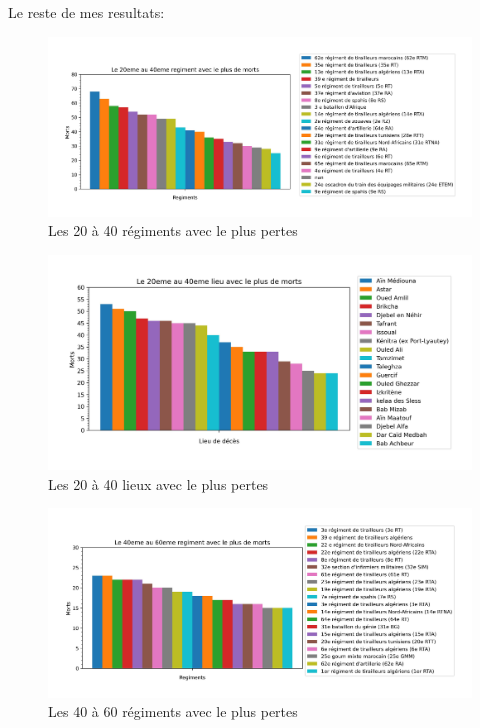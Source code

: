 Le reste de mes resultats: 
\begin{figure}[h]
    \centering
    \includegraphics[scale=0.7]{Images/next20regiments.jpg}
    \caption{Les 20 à 40 régiments avec le plus pertes}
    \label{fig:Régiments 2}
\end{figure}
\begin{figure}[h]
    \centering
    \includegraphics[scale=0.7]{Images/next20places.jpg}
    \caption{Les 20 à 40 lieux avec le plus pertes}
    \label{fig:Lieux 2}
\end{figure}
\begin{figure}[h]
    \centering
    \includegraphics[scale=0.7]{Images/last20regiments.jpg}
    \caption{Les 40 à 60 régiments avec le plus pertes}
    \label{fig:Régiments 3}
\end{figure}
